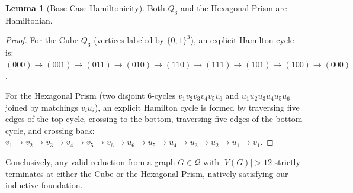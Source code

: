 \documentclass[12pt]{article}
\theoremstyle{definition}
\newtheorem{lemma}[theorem]{Lemma}
\begin{document}
\begin{lemma}[Base Case Hamiltonicity]
Both $Q_3$ and the Hexagonal Prism are Hamiltonian.
\end{lemma}
\begin{proof}
For the Cube $Q_3$ (vertices labeled by $\{0,1\}^3$), an explicit Hamilton cycle is:
$(000) \to (001) \to (011) \to (010) \to (110) \to (111) \to (101) \to (100) \to (000)$.

For the Hexagonal Prism (two disjoint 6-cycles $v_1v_2v_3v_4v_5v_6$ and $u_1u_2u_3u_4u_5u_6$ joined by matchings $v_i u_i$), an explicit Hamilton cycle is formed by traversing five edges of the top cycle, crossing to the bottom, traversing five edges of the bottom cycle, and crossing back:
$v_1 \to v_2 \to v_3 \to v_4 \to v_5 \to v_6 \to u_6 \to u_5 \to u_4 \to u_3 \to u_2 \to u_1 \to v_1$.
\end{proof}

Conclusively, any valid reduction from a graph $G \in \mathcal{Q}$ with $|V(G)| > 12$ strictly terminates at either the Cube or the Hexagonal Prism, natively satisfying our inductive foundation.
\end{document}
